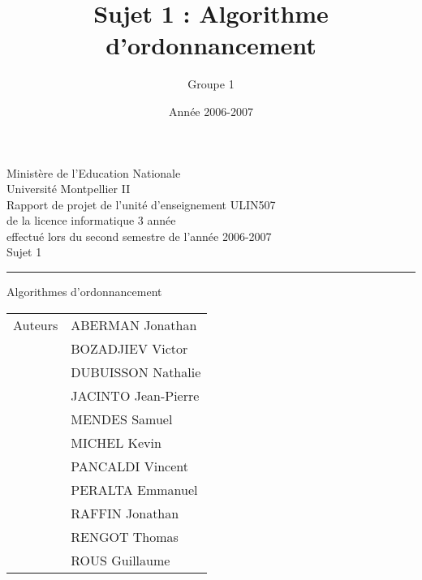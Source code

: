 \documentclass[A4]{report}
\title{Sujet 1 : Algorithme d'ordonnancement}
\author{Groupe 1}
\date{Année 2006-2007}
\theoremstyle{remark}
\newcommand{\sups}[1]{\raisebox{1ex}{\small #1}}
\begin{document}
\begin{titlepage}
\begin{center}
{\large
Ministère de l'Education Nationale \\
\vspace{0.8cm}
Université Montpellier II \\
\vspace{1.5cm}
Rapport de projet de l'unité d'enseignement ULIN507 \\
de la licence informatique 3\sups{ème} année \\
effectué lors du second semestre de l'année 2006-2007 \\
}
\vspace{4cm}
{\huge Sujet 1 }\\
\vspace{0.2cm}
\hrule
\vspace{0.2cm}
{\Huge Algorithmes d'ordonnancement}
\vspace{7cm}
\end{center}
\begin{flushright}
{\raggedleft
\begin{tabular}{r|l}
Auteurs & ABERMAN Jonathan \\
& BOZADJIEV Victor \\
& DUBUISSON Nathalie \\
& JACINTO Jean-Pierre \\
& MENDES Samuel \\
& MICHEL Kevin \\
& PANCALDI Vincent \\
& PERALTA Emmanuel \\
& RAFFIN Jonathan \\
& RENGOT Thomas \\
& ROUS Guillaume \\
\end{tabular}
}
\end{flushright}
\end{titlepage}
\tableofcontents






\end{document}
